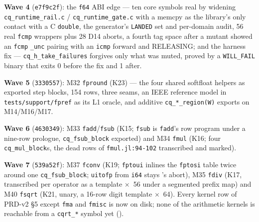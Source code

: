 \textbf{Wave 4} (\texttt{e7f9c2f}): the \texttt{f64} ABI edge --- ten core symbols real by widening
\texttt{cq\_runtime\_rail.c} / \texttt{cq\_runtime\_gate.c} with a memcpy as the library's only
contact with a C \texttt{double}, the generator's \texttt{LANDED} set and per-domain audit, 56 real
\texttt{fcmp} wrappers plus 28 D14 aborts, a fourth tag space after a mutant showed an \texttt{fcmp}
\texttt{\_unc} pairing with an \texttt{icmp} forward and RELEASING; and the harness fix ---
\texttt{cq\_h\_take\_failures} forgives only what was muted, proved by a \texttt{WILL\_FAIL} binary
that exits 0 before the fix and 1 after.

\textbf{Wave 5} (\texttt{3330557}): M32 \texttt{fpround} (K23) --- the four shared softfloat
helpers as exported step blocks, 154 rows, three seams, an IEEE reference model in
\texttt{tests/support/fpref} as its L1 oracle, and additive \texttt{cq\_*\_region(W)} exports on
M14/M16/M17.

\textbf{Wave 6} (\texttt{4630349}): M33 \texttt{fadd}/\texttt{fsub} (K15; \texttt{fsub} is
\texttt{fadd}'s row program under a nine-row prologue, \texttt{cq\_fsub\_block} exported) and M34
\texttt{fmul} (K16; four \texttt{cq\_mul\_block}s, the dead rows of \texttt{fmul.jl:94-102}
transcribed and marked).

\textbf{Wave 7} (\texttt{539a52f}): M37 \texttt{fconv} (K19; \texttt{fptoui} inlines the
\texttt{fptosi} table twice around one \texttt{cq\_fsub\_block}; \texttt{uitofp} from \texttt{i64}
stays 's abort), M35 \texttt{fdiv} (K17, transcribed per operator as a template
$\times$~56 under a segmented prefix map) and M40 \texttt{fsqrt} (K21, unary, a 16-row digit
template $\times$~64). Every kernel row of PRD-v2 \S5 except \texttt{fma} and \texttt{fmisc} is now
on disk; none of the arithmetic kernels is reachable from a \texttt{cqrt\_*} symbol yet
().

